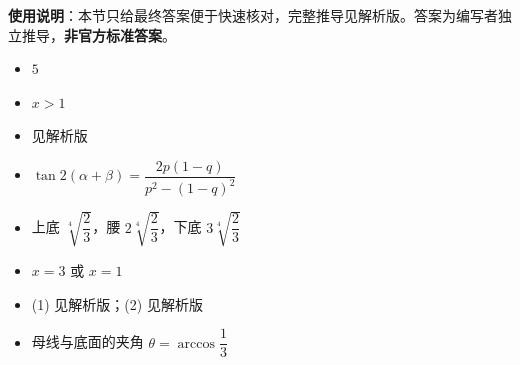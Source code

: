 
\begin{gknotice}
\textbf{使用说明}：本节只给最终答案便于快速核对，完整推导见解析版。答案为编写者独立推导，\textbf{非官方标准答案}。
\end{gknotice}

\begin{itemize}[leftmargin=2.6em]
  \item[\textbf{1.}] $5$
  \item[\textbf{2.}] $x>1$
  \item[\textbf{3.}] 见解析版
  \item[\textbf{4.}] $\tan 2(\alpha+\beta)=\dfrac{2p(1-q)}{p^2-(1-q)^2}$
  \item[\textbf{5.}] 上底 $\sqrt[4]{\dfrac23}$，腰 $2\sqrt[4]{\dfrac23}$，下底 $3\sqrt[4]{\dfrac23}$
  \item[\textbf{6.}] $x=3$ 或 $x=1$
  \item[\textbf{7.}] (1) 见解析版；(2) 见解析版
  \item[\textbf{8.}] 母线与底面的夹角 $\theta=\arccos\dfrac13$
\end{itemize}
